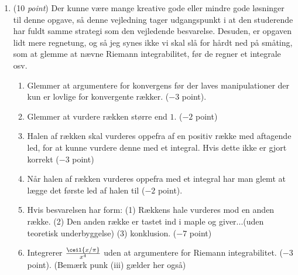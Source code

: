 \documentclass{article}
\begin{document}
\begin{opg}\hfill
	\begin{enumerate}
			\item (10 \emph{point}) Der kunne være mange kreative gode eller mindre gode løsninger til denne opgave, så denne vejledning tager udgangspunkt i at den studerende har fuldt samme strategi som den vejledende besvarelse. Desuden, er opgaven lidt mere regnetung, og så jeg synes ikke vi skal slå for hårdt ned på småting, som at glemme at nævne Riemann integrabilitet, før de regner et integrale osv.
			\begin{enumerate}[label=(\roman*)]
				\item Glemmer at argumentere for konvergens før der laves manipulationer der kun er lovlige for konvergente rækker. ($ -3 $ point).
				\item Glemmer at vurdere rækken større end $ 1 $. ($ -2 $ point)
				\item Halen af rækken skal vurderes oppefra af en positiv række med aftagende led, for at kunne vurdere denne med et integral. Hvis dette ikke er gjort korrekt ($ -3 $ point)
				\item Når halen af rækken vurderes oppefra med et integral har man glemt at lægge det første led af halen til ($ -2 $ point).
				\item Hvis besvarelsen har form: (1) Rækkens hale vurderes mod en anden række. (2) Den anden række er tastet ind i maple og giver...(uden teoretisk underbyggelse) (3) konklusion. ($ -7 $ point)
				\item Integrerer $ \frac{\ceil{x/\pi}}{x^4} $ uden at argumentere for Riemann integrabilitet. ($ -3 $ point). (Bemærk punk (iii) gælder her også)
			\end{enumerate}
	\end{enumerate}
\end{opg}
\end{document}
